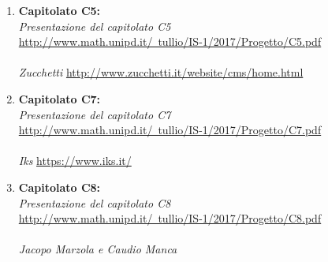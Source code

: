 \documentclass[StudioDiFattibilità.tex]{subfiles}
\begin{document}
\begin{enumerate}
	\item \textbf{Capitolato C5:}\\
		\textit{Presentazione del capitolato C5}\\
		\href{http://www.math.unipd.it/~tullio/IS-1/2017/Progetto/C5.pdf}{http://www.math.unipd.it/~tullio/IS-1/2017/Progetto/C5.pdf}\\\\
		\textit{Zucchetti} \href{http://www.zucchetti.it/website/cms/home.html}{http://www.zucchetti.it/website/cms/home.html}

	\item \textbf{Capitolato C7:}\\
		\textit{Presentazione del capitolato C7}\\
		\href{http://www.math.unipd.it/~tullio/IS-1/2017/Progetto/C7.pdf}{http://www.math.unipd.it/~tullio/IS-1/2017/Progetto/C7.pdf}\\\\
		\textit{Iks} \href{https://www.iks.it/}{https://www.iks.it/}

	\item \textbf{Capitolato C8:}\\
		\textit{Presentazione del capitolato C8}\\
		\href{http://www.math.unipd.it/~tullio/IS-1/2017/Progetto/C8.pdf}{http://www.math.unipd.it/~tullio/IS-1/2017/Progetto/C8.pdf}\\\\
		\textit{Jacopo Marzola e Caudio Manca}


\end{enumerate}
\end{document}
